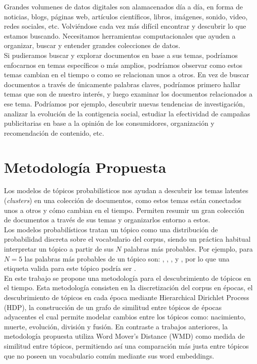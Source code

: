 \documentclass[letterpaper,12pt,oneside]{book} %
\begin{document}
Grandes volumenes de datos digitales son alamacenados día a día, en forma de noticias, blogs, páginas web, artículos científicos, libros, imágenes, sonido, video, redes sociales, etc. Volviéndose cada vez más difícil encontrar y descubrir lo que estamos buscando. Necesitamos herramientas computacionales que ayuden a organizar, buscar y entender grandes colecciones de datos.\\

Si pudieramos buscar y explorar documentos en base a sus temas, podríamos enfocarnos en temas específicos o más amplios, podríamos observar como estos temas cambian en el tiempo o como se relacionan unos a otros. En vez de buscar documentos a través de únicamente palabras claves, podríamos primero hallar temas que son de nuestro interés, y luego examinar los documentos relacionados a ese tema. Podríamos por ejemplo, descubrir nuevas tendencias de investigación, analizar la evolución de la contigencia social, estudiar la efectividad de campañas publicitarias en base a la opinión de los consumidores, organización y recomendación de contenido, etc.\\

\section{Metodología Propuesta}
Los modelos de tópicos probabilísticos nos ayudan a descubrir los temas latentes (\textit{clusters}) en una colección de documentos, como estos temas están conectados unos a otros y cómo cambian en el tiempo. Permiten resumir un gran colección de documentos a través de sus temas y organizarlos entorno a estos.\\

Los modelos probabilísticos tratan un tópico como una distribución de probabilidad discreta sobre el vocabulario del corpus, siendo un práctica habitual interpretar un tópico a partir de sus $N$ palabras más probables. Por ejemplo, para $N=5$ las palabras más probables de un tópico son: , , ,  y , por lo que una etiqueta valida para este tópico podría ser .\\ 

En este trabajo se propone una metodología para el descubrimiento de tópicos en el tiempo. Esta metodología consisten en la discretización del corpus en épocas, el descubrimiento de tópicos en cada época mediante Hierarchical Dirichlet Process (HDP), la construcción de un grafo de similitud entre tópicos de épocas adyacentes el cual permite modelar cambios entre los tópicos como: nacimiento, muerte, evolución, división y fusión. En contraste a trabajos anteriores, la metodología propuesta utiliza Word Mover's Distance (WMD) como medida de similitud entre tópicos, permitiendo así una comparación más justa entre tópicos que no poseen un vocabulario común mediante sus word embeddings.\\
\end{document}
